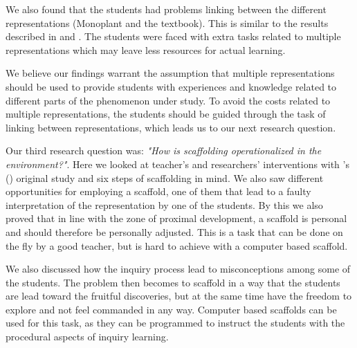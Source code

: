 We also found that the students had problems linking between the different representations (Monoplant and the textbook). This is similar to the results described in \citet{ainsworth1999functions} and \citet{van2006supporting}. The students were faced with extra tasks related to multiple representations which may leave less resources for actual learning. 

We believe our findings warrant the assumption that multiple representations should be used to provide students with experiences and knowledge related to different parts of the phenomenon under study. To avoid the costs related to multiple representations, the students should be guided through the task of linking between representations, which leads us to our next research question.






Our third research question was: \emph{"How is scaffolding operationalized in the environment?"}.
Here we looked at teacher's and researchers' interventions with \citeauthor{wood1976role}'s (\citeyear{wood1976role}) original study and six steps of scaffolding in mind. We also saw different opportunities for employing a scaffold, one of them that lead to a faulty interpretation of the representation by one of the students. By this we also proved that in line with the zone of proximal development, a scaffold is personal and should therefore be personally adjusted. This is a task that can be done on the fly by a good teacher, but is hard to achieve with a computer based scaffold. 

We also discussed how the inquiry process lead to misconceptions among some of the students. The problem then becomes to scaffold in a way that the students are lead toward the fruitful discoveries, but at the same time have the freedom to explore and not feel commanded in any way. Computer based scaffolds can be used for this task, as they can be programmed to instruct the students with the procedural aspects of inquiry learning. 

